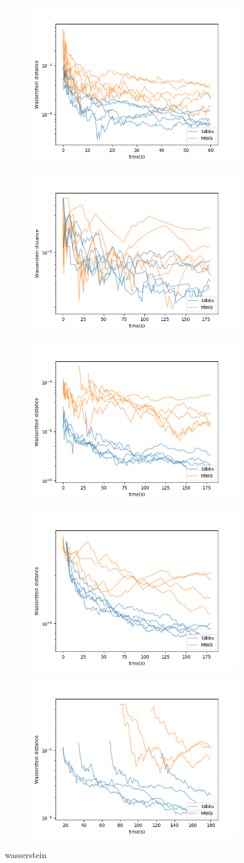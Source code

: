 \begin{figure}[h]
    \centering
    \begin{subfigure}
    	\centering
        \includegraphics[width=0.3\linewidth]{../../plots/KL_M2_N50_NMCMC1_seed0_diffind2.png}
    \end{subfigure}
    \begin{subfigure}
        \centering
    	\includegraphics[width=0.3\linewidth]{../../plots/KL_M2_N20000_NMCMC3_seed0_diffind2.png}
	\end{subfigure}
	\begin{subfigure}
	    \centering
    	\includegraphics[width=0.3\linewidth]{../../plots/KL_M3_N100_NMCMC3_seed0_diffind2.png}
	\end{subfigure}
	\begin{subfigure}
	    \centering
    	\includegraphics[width=0.3\linewidth]{../../plots/KL_M4_N100_NMCMC3_seed0_diffind2.png}
	\end{subfigure}
	\begin{subfigure}
	    \centering
    	\includegraphics[width=0.3\linewidth]{../../plots/KL_M4_N60_NMCMC3_seed0_diffind2.png}
	\end{subfigure}
	\caption{wasserstein}
\end{figure}

